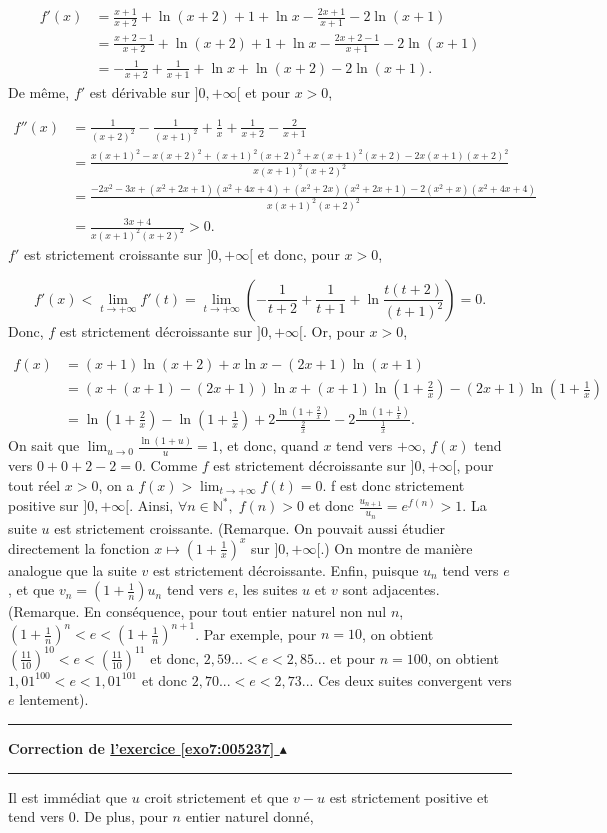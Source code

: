 \documentclass[11pt,a4paper]{article}
\newcommand{\Nn}{\mathbb{N}} \newcommand{\N}{\mathbb{N}}
\newcounter{exo}
\newcommand{\correction}[1]{\hypertarget{cor7:#1}{}\label{cor7:#1}{\bf Correction de \hyperlink{exo7:#1}{l'exercice \ref{exo7:#1} $\blacktriangle$}}\vspace{1mm}\hrule\vspace{1mm}}
\newcommand{\fincorrection}{\vspace{1mm}\hrule\vspace*{7mm}}
\begin{document}
\begin{align*}
f'(x)&=\frac{x+1}{x+2}+\ln(x+2)+1+\ln x-\frac{2x+1}{x+1}-2\ln(x+1)\\
 &=\frac{x+2-1}{x+2}+\ln(x+2)+1+\ln x-\frac{2x+2-1}{x+1}-2\ln(x+1)\\
 &=-\frac{1}{x+2}+\frac{1}{x+1}+\ln x+\ln(x+2)-2\ln(x+1).
\end{align*}
De même, $f'$ est dérivable sur $]0,+\infty[$ et pour $x>0$,

\begin{align*}
f''(x)&=\frac{1}{(x+2)^2}-\frac{1}{(x+1)^2}+\frac{1}{x}+\frac{1}{x+2}-\frac{2}{x+1}\\ 
 &=\frac{x(x+1)^2-x(x+2)^2+(x+1)^2(x+2)^2+x(x+1)^2(x+2)-2x(x+1)(x+2)^2}{x(x+1)^2(x+2)^2}\\
 &=\frac{-2x^2-3x+(x^2+2x+1)(x^2+4x+4)+(x^2+2x)(x^2+2x+1)-2(x^2+x)(x^2+4x+4)}{x(x+1)^2(x+2)^2}\\
 &=\frac{3x+4}{x(x+1)^2(x+2)^2}>0.
\end{align*}
$f'$ est strictement croissante sur $]0,+\infty[$ et donc, pour $x>0$, 

$$f'(x)<\lim_{t\rightarrow +\infty}f'(t)=\lim_{t\rightarrow +\infty}\left(-\frac{1}{t+2}+\frac{1}{t+1}+\ln\frac{t(t+2)}{(t+1)^2}\right)=0.$$
Donc, $f$ est strictement décroissante sur $]0,+\infty[$. Or, pour $x>0$,

\begin{align*}
f(x)&=(x+1)\ln(x+2)+x\ln x-(2x+1)\ln(x+1)\\
 &=(x+(x+1)-(2x+1))\ln x+(x+1)\ln\left(1+\frac{2}{x}\right)-(2x+1)\ln\left(1+\frac{1}{x}\right)\\
 &=\ln\left(1+\frac{2}{x}\right)-\ln\left(1+\frac{1}{x}\right)+2\frac{\ln\left(1+\frac{2}{x}\right)}{\frac{2}{x}}-2\frac{\ln\left(1+\frac{1}{x}\right)}{\frac{1}{x}}.
\end{align*}
On sait que $\lim_{u\rightarrow 0}\frac{\ln(1+u)}{u}=1$, et donc, quand $x$ tend vers $+\infty$, $f(x)$ tend vers $0+0+2-2=0$. Comme $f$ est strictement décroissante sur $]0,+\infty[$, pour tout réel $x>0$, on a $f(x)>\lim_{t\rightarrow +\infty}f(t)=0$.
f est donc strictement positive sur $]0,+\infty[$. Ainsi, $\forall n\in\Nn^*,\;f(n)>0$ et donc $\frac{u_{n+1}}{u_n}=e^{f(n)}>1$. La suite $u$ est strictement croissante.
(Remarque. On pouvait aussi étudier directement la fonction $x\mapsto\left(1+\frac{1}{x}\right)^x$ sur $]0,+\infty[$.)
On montre de manière analogue que la suite $v$ est strictement décroissante. Enfin, puisque $u_n$ tend vers $e$, et que $v_n=\left(1+\frac{1}{n}\right)u_n$ tend vers $e$, les suites $u$ et $v$ sont adjacentes.
(Remarque. En conséquence, pour tout entier naturel non nul $n$, $\left(1+\frac{1}{n}\right)^n<e<\left(1+\frac{1}{n}\right)^{n+1}$. Par exemple, pour $n=10$, on obtient $\left(\frac{11}{10}\right)^{10}<e<\left(\frac{11}{10}\right)^{11}$ et donc, $2,59...<e<2,85...$ et pour $n=100$, on obtient $1,01^{100}<e<1,01^{101}$ et donc $2,70...<e<2,73...$ Ces deux suites convergent vers $e$ lentement).
\fincorrection
\correction{005237}
Il est immédiat que $u$ croit strictement et que $v-u$ est strictement positive et tend vers $0$.
De plus, pour $n$ entier naturel donné, 
\end{document}
